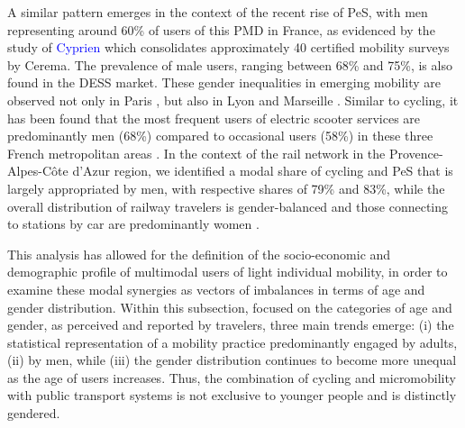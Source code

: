 \begin{refsegment}
A similar pattern emerges in the context of the recent rise of \acrshort{PeS}, with men representing around 60\% of users of this \acrshort{PMD} in France, as evidenced by the study of \textcolor{blue}{Cyprien} \textcolor{blue}{\textcite{richer_dossier_2021}} which consolidates approximately 40 certified mobility surveys by \acrfull{Cerema}. The prevalence of male users, ranging between 68\% and 75\%, is also found in the \acrshort{DESS} market. These gender inequalities in emerging mobility are observed not only in Paris \textcolor{blue}{\autocites[46]{apur_mobilites_2020}[14]{6t-bureau_de_recherche_comprendre_2019}[annexes]{bortoli_consequential_2020}}, but also in Lyon and Marseille \textcolor{blue}{\autocite[50]{6t-bureau_de_recherche_usages_2019}}. Similar to cycling, it has been found that the most frequent users of electric scooter services are predominantly men (68\%) compared to occasional users (58\%) in these three French metropolitan areas \textcolor{blue}{\autocite[65]{6t-bureau_de_recherche_usages_2019}}. In the context of the rail network in the Provence-Alpes-Côte d'Azur region, we identified a modal share of cycling and \acrshort{PeS} that is largely appropriated by men, with respective shares of 79\% and 83\%, while the overall distribution of railway travelers is gender-balanced and those connecting to stations by car are predominantly women \textcolor{blue}{\autocite[183]{moinse_intermodal_2022}}. %

This analysis has allowed for the definition of the socio-economic and demographic profile of multimodal users of light individual mobility, in order to examine these modal synergies as vectors of imbalances in terms of age and gender distribution. Within this subsection, focused on the categories of age and gender, as perceived and reported by travelers, three main trends emerge: (i) the statistical representation of a mobility practice predominantly engaged by adults, (ii) by men, while (iii) the gender distribution continues to become more unequal as the age of users increases. Thus, the combination of cycling and micromobility with public transport systems is not exclusive to younger people and is distinctly gendered. %


\end{refsegment}
